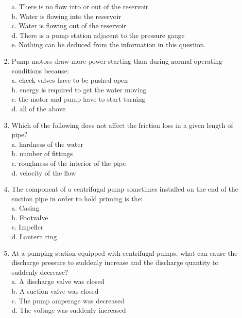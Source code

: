 \documentclass{article}
\begin{document}
\begin{enumerate}[1.]
a. There is no flow into or out of the reservoir\\

b. Water is flowing into the reservoir\\

c. Water is flowing out of the reservoir\\

d. There is a pump station adjacent to the pressure gauge\\

e. Nothing can be deduced from the information in this question.\\

\item Pump motors draw more power starting than during normal operating conditions because:\\
a.	check valves have to be pushed open\\
b.	energy is required to get the water moving\\
c.	the motor and pump have to start turning\\
d.	all of the above

\item Which of the following does not affect the friction loss in a given length of pipe?\\
a.	hardness of the water\\
b.	number of fittings\\
c.	roughness of the interior of the pipe\\
d.	velocity of the flow\\

\item The component of a centrifugal pump sometimes installed on the end of the suction pipe in order to hold priming is the:\\
a. Casing\\
b. Footvalve\\
c. Impeller\\
d. Lantern ring\\

\item At a pumping station equipped with centrifugal pumps, what can cause the discharge pressure to suddenly increase and the discharge quantity to suddenly decrease?\\
a. A discharge valve was closed\\
b. A suction valve was closed\\
c. The pump amperage was decreased\\
d. The voltage was suddenly increased



\end{enumerate}
\end{document}
